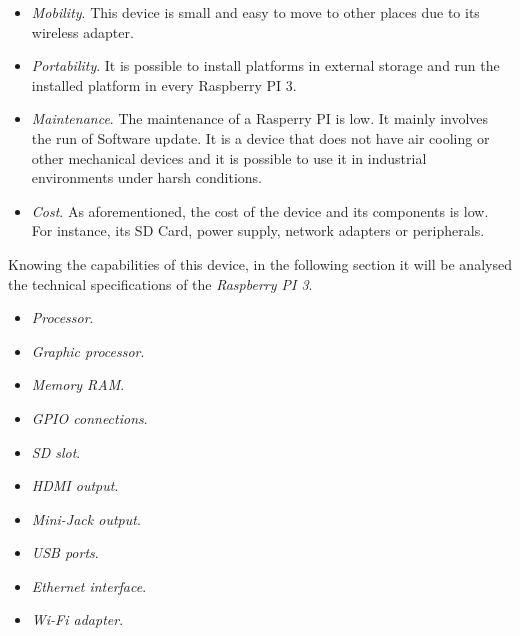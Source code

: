 \begin{itemize}

\item \textit{Mobility}. This device is small and easy to move to other places due to its wireless adapter.

\item \textit{Portability}. It is possible to install platforms in external storage and run the installed platform in every Raspberry PI 3.

\item \textit{Maintenance}. The maintenance of a Rasperry PI is low. It mainly involves the run of Software update. It is a device that does not have air cooling or other mechanical devices and it is possible to use it in industrial environments under harsh conditions.

\item \textit{Cost}. As aforementioned, the cost of the device and its components is low. For instance, its SD Card, power supply, network adapters or peripherals.

\end{itemize}

Knowing the capabilities of this device, in the following section it will be analysed the technical specifications of the \textit{Raspberry PI 3}.

\begin{itemize}

\item \textit{Processor}.

\item \textit{Graphic processor}.

\item \textit{Memory RAM}.

\item \textit{GPIO connections}.

\item \textit{SD slot}.

\item \textit{HDMI output}.

\item \textit{Mini-Jack output}.

\item \textit{USB ports}.

\item \textit{Ethernet interface}.

\item \textit{Wi-Fi adapter}.

\end{itemize}

